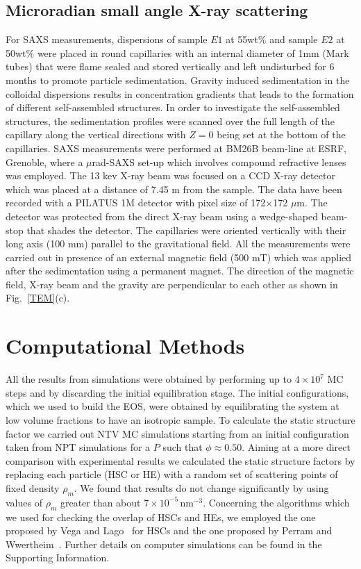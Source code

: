 \documentclass[aps,prl,preprint,superscriptaddress]{revtex4-1} %
\def\nm{\,\si{\nano\meter}}%
\begin{document}
\subsection{Microradian small angle X-ray scattering}
For SAXS measurements, dispersions of sample $E1$ at 55wt\% and sample $E2$ at 50wt\% were placed in round capillaries with an internal diameter of 1mm (Mark tubes) that were flame sealed and stored vertically and left undisturbed for 6 months to promote particle sedimentation. Gravity induced sedimentation in the colloidal dispersions results in concentration gradients that leads to the formation of different self-assembled structures. In order to investigate the self-assembled structures, the sedimentation profiles were scanned over the full length of the capillary along the vertical directions with $Z=0$ being set at the bottom of the capillaries. SAXS measurements were performed at BM26B beam-line at ESRF, Grenoble, where a $\mu$rad-SAXS set-up which involves compound refractive lenses~\cite{petukhov2015particle} was employed. The 13 kev X-ray beam was focused on a CCD X-ray detector which was placed at a distance of 7.45 m from the sample. The data have been recorded with a PILATUS 1M detector with pixel size of 172$\times$172 $\mu$m. The detector was protected from the direct X-ray beam using a wedge-shaped beam-stop that shades the detector. The capillaries were oriented vertically with their long axis (100 mm) parallel to the gravitational field. All the measurements were carried out in presence of an external magnetic field (500 mT) which was applied after the sedimentation using a permanent magnet. The direction of the magnetic field, X-ray beam and the gravity are perpendicular to each other as shown in Fig.~\ref{TEM}(c).
\section{Computational Methods}
All the results from simulations were obtained by performing up to $4\times10^7$ MC steps and by discarding the initial equilibration stage.
The initial configurations, which we used to build the EOS, were obtained by equilibrating the system at low volume fractions to have an isotropic
sample. To calculate the static structure factor we carried out NTV MC simulations starting from an initial configuration taken 
from NPT simulations for a $P$ such that $\phi\approx 0.50$. Aiming at a more direct comparison with experimental results we calculated
the static structure factors by replacing each particle (HSC or HE) with a random set of scattering points of fixed density $\rho_m$. We found
that results do not change significantly by using values of $\rho_m$ greater than about $7\times 10^{-5} \nm^{-3}$.%
Concerning the algorithms which we used for checking the overlap of HSCs and HEs, we employed the one proposed by Vega and Lago~\cite{VegaHSC1994} for HSCs and
the one proposed by Perram and Wwertheim~\cite{PerramJCP1985}. Further details on computer simulations can be found in the Supporting Information.
\end{document}
